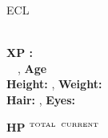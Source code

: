 \documentclass[article,10pt]{memoir}
\newcommand{\afterenum}{\everypar{\parindent=0pt\hangindent=1em}}
\newcommand{\superscript}[1]{\ensuremath{^{\textrm{#1}}}}
\begin{document}




{\LARGE \charname \large\hfill ECL  }

\begin{multicols}{2}
\begingroup
{}\selectfont
\raggedright
\afterenum
\charrace \ \charclass \\
\textbf{XP :}  \\
\charalignment \ \charsize \ \chartype, \textbf{Age} \\

\textbf{Height:} \charheight, \textbf{Weight:} \charweight \\
\textbf{Hair:} \charhair, \textbf{Eyes:} \chareyes\\
\vspace{1mm}

\vspace{1mm}
\large
\textbf{HP} \superscript{\tiny TOTAL}  \superscript{\tiny CURRENT}  \\



\end{multicols}
\end{document}
